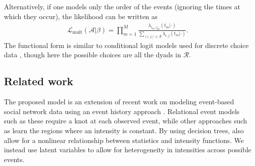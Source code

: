 Alternatively, if one models only the order of the events (ignoring the times at which they occur), the likelihood can be written as
\begin{align}
\mathcal{L}_{\mbox{mult}}(\mathcal{A}|\beta) = \prod_{m=1}^M \frac{\lambda_{i_m,j_m}(t_m | \cdot)}{\sum_{(i,j) \in \mathcal{R}} \lambda_{i,j}(t_m | \cdot)}.
\label{eqn:multllk}
\end{align}
The functional form is similar to conditional logit models used for discrete choice data \cite{McFadden1984}, though here the possible choices are all the dyads in $\mathcal{R}$.

\subsection{Related work}
The proposed model is an extension of recent work on modeling event-based social network data using an event history approach \cite{Butts2008,Brandes2009,Perry2011,Stadtfeld2010,Stadtfeld2011,Opsahl2011,Vu2011,Vu2011a}. %
Relational event models such as these require a knot at each observed event, while other approaches such as \cite{Gunawardana2011} learn the regions where an intensity is constant.
By using decision trees,  \cite{Gunawardana2011} also allow for a nonlinear relationship between statistics and intensity functions.  
We instead use latent variables to allow for heterogeneity in intensities across possible events.
